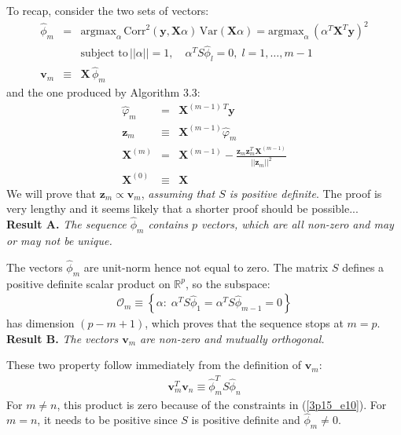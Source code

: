 To recap, consider the two sets of vectors:
\begin{eqnarray}\label{3p15_e10}
\hat{\phi}_m  & = &  \textrm{argmax}_\alpha\, \textrm{Corr}^2 \left( \mathbf{y}, \mathbf{X} \alpha \right)\, \textrm{Var} \left( \mathbf{X} \alpha \right) = \textrm{argmax}_\alpha\, \left( \alpha^T \mathbf{X}^T \mathbf{y} \right)^2\\ \nonumber
&& \textrm{subject to} \, ||\alpha|| = 1, \quad \alpha^T S \hat{\phi}_l = 0, \;l = 1, \ldots, m - 1\\
\mathbf{v}_m & \equiv & \mathbf{X}\, \hat{\phi}_m 
\end{eqnarray}
and the one produced by Algorithm 3.3:
\begin{eqnarray}
\hat{\varphi}_m & = & \mathbf{X}^{(m-1) \, T} \mathbf{y}\\
\label{3p15_3p3}
\mathbf{z}_m & \equiv & \mathbf{X}^{(m-1)} \hat{\varphi}_m \\
\label{3p15_orthRec}
\mathbf{X}^{(m)} & = & \mathbf{X}^{(m-1)} - \frac{\mathbf{z}_{m} \mathbf{z}_{m}^T \mathbf{X}^{(m - 1)}}{||\mathbf{z}_{m}||^2}\\
\mathbf{X}^{(0)} & \equiv &\mathbf{X}
\end{eqnarray}
We will prove that $\mathbf{z}_m \propto \mathbf{v}_m$, \textit{assuming that $S$ is positive definite}. The proof is very lengthy and it seems likely that a shorter
proof should be possible...
\vspace{0.5cm}\\
\noindent\textbf{Result A.} \textit{The sequence $\hat{\phi}_m$ contains $p$ vectors, which are all non-zero and 
    may or may not be unique.}

\noindent The vectors $\hat{\phi}_m$ are unit-norm hence not equal to zero. The matrix $S$ defines a positive definite scalar product on $\mathbb{R}^p$, so the subspace:
\begin{eqnarray*}
    \mathcal{O}_m \equiv \left\{ \alpha: \; \alpha^T S \hat{\phi} _{1} =  \alpha^T S \hat{\phi} _{ m - 1} = 0 \right\}
\end{eqnarray*}
has dimension $(p - m + 1)$, which proves that the sequence stops at $ m = p$.
\vspace{0.5cm}\\
\noindent \textbf{Result B.} \textit{The vectors $\mathbf{v}_m$ are non-zero and mutually orthogonal.}

\noindent These two property follow immediately from the definition of $\mathbf{v}_m$:
\begin{eqnarray*}
    \mathbf{v}_m ^T \mathbf{v}_n \equiv \hat{\phi}_m ^T S \hat{\phi}_n
\end{eqnarray*}
For $m \neq n$, this product is zero because of the constraints in (\ref{3p15_e10}). For $m = n$,
it needs to be positive since $S$ is positive definite and $\hat{\phi}_m \neq 0$.

